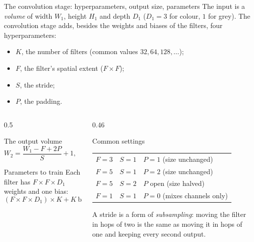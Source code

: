 \documentclass[10pt,aspectratio=169]{beamer}
\begin{document}
\begin{frame}{The convolution stage: hyperparameters, output size, parameters}
\small
The input is a \emph{volume} of width $W_1$, height $H_1$ and depth $D_1$
($D_1=3$ for colour, $1$ for grey).  The convolution stage adds, besides the
weights and biases of the filters, four hyperparameters:
\begin{itemize}
  \item $K$, the number of filters (common values $32,64,128,\dots$);
  \item $F$, the filter's spatial extent ($F\times F$);
  \item $S$, the stride;
  \item $P$, the padding.
\end{itemize}
\begin{columns}[T]
\begin{column}{0.5\textwidth}
\begin{block}{The output volume}
\[
  W_2=\frac{W_1-F+2P}{S}+1,\qquad H_2=\frac{H_1-F+2P}{S}+1,\qquad D_2=K .
\]
\end{block}
\begin{block}{Parameters to train}
Each filter has $F\times F\times D_1$ weights and one bias:
\[
  (F\times F\times D_1)\times K+K\ \text{biases}.
\]
\end{block}
\end{column}
\begin{column}{0.46\textwidth}
\begin{block}{Common settings}
\begin{tabular}{@{}lll@{}}
$F=3$ & $S=1$ & $P=1$ \quad(size unchanged)\\
$F=5$ & $S=1$ & $P=2$ \quad(size unchanged)\\
$F=5$ & $S=2$ & $P$ open \quad(size halved)\\
$F=1$ & $S=1$ & $P=0$ \quad(mixes channels only)
\end{tabular}
\end{block}
\scriptsize A stride is a form of \emph{subsampling}: moving the filter
in hops of two is the same as moving it in hops of one and keeping every
second output.
\end{column}
\end{columns}
\end{frame}
\end{document}
